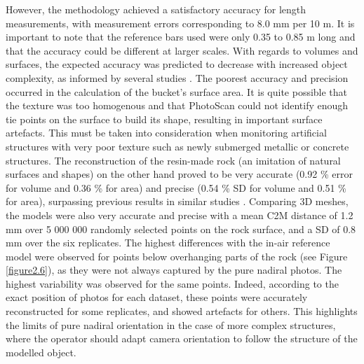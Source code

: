 However, the methodology achieved a satisfactory accuracy for length measurements, with measurement errors corresponding to 8.0 mm per 10 m. It is important to note that the reference bars used were only 0.35 to 0.85 m long and that the accuracy could be different at larger scales. With regards to volumes and surfaces, the expected accuracy was predicted to decrease with increased object complexity, as informed by several studies \citep{figueira_accuracy_2015, bryson_characterization_2017}. The poorest accuracy and precision occurred in the calculation of the bucket’s surface area. It is quite possible that the texture was too homogenous and that PhotoScan could not identify enough tie points on the surface to build its shape, resulting in important surface artefacts. This must be taken into consideration when monitoring artificial structures with very poor texture such as newly submerged metallic or concrete structures. The reconstruction of the resin-made rock (an imitation of natural surfaces and shapes) on the other hand proved to be very accurate (0.92 \% error for volume and 0.36 \% for area) and precise (0.54 \% SD for volume and 0.51 \% for area), surpassing previous results in similar studies \citep{figueira_accuracy_2015, bythell_three-dimensional_2001, courtney_estimating_2007, gutierrez-heredia_end_2016, lavy_quick_2015, shortis_calibration_2015}. Comparing 3D meshes, the models were also very accurate and precise with a mean C2M distance of 1.2 mm over 5 000 000 randomly selected points on the rock surface, and a SD of 0.8 mm over the six replicates. The highest differences with the in-air reference model were observed for points below overhanging parts of the rock (see Figure \ref{figure2.6}), as they were not always captured by the pure nadiral photos. The highest variability was observed for the same points. Indeed, according to the exact position of photos for each dataset, these points were accurately reconstructed for some replicates, and showed artefacts for others. This highlights the limits of pure nadiral orientation in the case of more complex structures, where the operator should adapt camera orientation to follow the structure of the modelled object.

